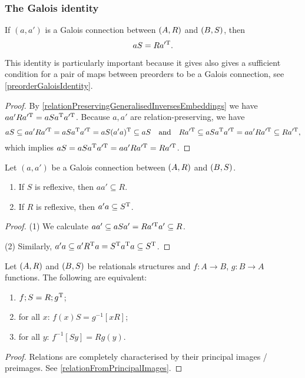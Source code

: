 \subsubsection{The Galois identity}
\begin{proposition} \label{GaloisIdentity}
If $(a,a')$ is a Galois connection between $\left( A,R \right)$ and $\left( B,S \right)$, then
\[ aS = Ra^{\prime \mathrm{T}}. \]
\end{proposition}
This identity is particularly important because it gives also gives a sufficient condition for a pair of maps between preorders to be a Galois connection, see \ref{preorderGaloisIdentity}.
\begin{proof}
By \ref{relationPreservingGeneralisedInversesEmbeddings} we have $aa'R a^{\prime\mathrm{T}} = aSa^{\mathrm{T}} a^{\prime\mathrm{T}}$. Because $a,a'$ are relation-preserving, we have
\[ aS \subseteq aa'R a^{\prime\mathrm{T}} = aSa^{\mathrm{T}} a^{\prime\mathrm{T}} = aS(a'a)^{\mathrm{T}} \subseteq aS \quad\text{and}\quad Ra^{\prime\mathrm{T}} \subseteq aSa^{\mathrm{T}} a^{\prime\mathrm{T}} = aa'R a^{\prime\mathrm{T}} \subseteq Ra^{\prime\mathrm{T}}, \]
which implies $aS = aSa^{\mathrm{T}} a^{\prime\mathrm{T}} = aa'R a^{\prime\mathrm{T}} = Ra^{\prime\mathrm{T}}$.
\end{proof}
\begin{corollary} \label{reflexiveGaloisCorollary}
Let $(a,a')$ be a Galois connection between $\left( A,R \right)$ and $\left( B,S \right)$.
\begin{enumerate}
\item If $S$ is reflexive, then $aa' \subseteq R$.
\item If $R$ is reflexive, then $a'a \subseteq S^{\mathrm{T}}$.
\end{enumerate}
\end{corollary}
\begin{proof}
(1) We calculate $aa' \subseteq aSa' = Ra^{\prime \mathrm{T}}a' \subseteq R$.

(2) Similarly, $a'a \subseteq a'R^{\mathrm{T}} a = S^{\mathrm{T}} a^{\mathrm{T}} a \subseteq S^{\mathrm{T}}$.
\end{proof}

\begin{lemma} \label{preimagesGaloisIdentity}
Let $\left( A, R \right)$ and $\left( B, S \right)$ be relationals structures and $f: A\to B$, $g: B\to A$ functions.
The following are equivalent:
\begin{enumerate}
\item $f;S = R;g^{\mathrm{T}}$;
\item for all $x$: $f(x)S = g^{-1}[xR]$;
\item for all $y$: $f^{-1}[Sy] = Rg(y)$.
\end{enumerate}
\end{lemma}
\begin{proof}
Relations are completely characterised by their principal images / preimages. See \ref{relationFromPrincipalImages}.
\end{proof}

